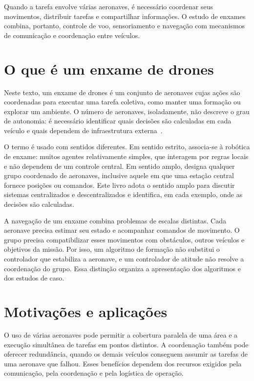 \documentclass[11pt,a4paper,oneside]{book}
\numberwithin{equation}{chapter}
\begin{document}
Quando a tarefa envolve várias aeronaves, é necessário coordenar seus movimentos, distribuir tarefas e compartilhar informações. O estudo de enxames combina, portanto, controle de voo, sensoriamento e navegação com mecanismos de comunicação e coordenação entre veículos.

\section{O que é um enxame de drones}
Neste texto, um enxame de drones é um conjunto de aeronaves cujas ações são coordenadas para executar uma tarefa coletiva, como manter uma formação ou explorar um ambiente. O número de aeronaves, isoladamente, não descreve o grau de autonomia: é necessário identificar quais decisões são calculadas em cada veículo e quais dependem de infraestrutura externa~\cite{survey}.

O termo é usado com sentidos diferentes. Em sentido estrito, associa-se à robótica de enxame: muitos agentes relativamente simples, que interagem por regras locais e não dependem de um controle central. Em sentido amplo, designa qualquer grupo coordenado de aeronaves, inclusive aquele em que uma estação central fornece posições ou comandos. Este livro adota o sentido amplo para discutir sistemas centralizados e descentralizados e identifica, em cada exemplo, onde as decisões são calculadas.

A navegação de um enxame combina problemas de escalas distintas. Cada aeronave precisa estimar seu estado e acompanhar comandos de movimento. O grupo precisa compatibilizar esses movimentos com obstáculos, outros veículos e objetivos da missão. Por isso, um algoritmo de formação não substitui o controlador que estabiliza a aeronave, e um controlador de atitude não resolve a coordenação do grupo. Essa distinção organiza a apresentação dos algoritmos e dos estudos de caso.

\section{Motivações e aplicações}
O uso de várias aeronaves pode permitir a cobertura paralela de uma área e a execução simultânea de tarefas em pontos distintos. A coordenação também pode oferecer redundância, quando os demais veículos conseguem assumir as tarefas de uma aeronave que falhou. Esses benefícios dependem dos recursos exigidos pela comunicação, pela coordenação e pela logística de operação.
\end{document}
